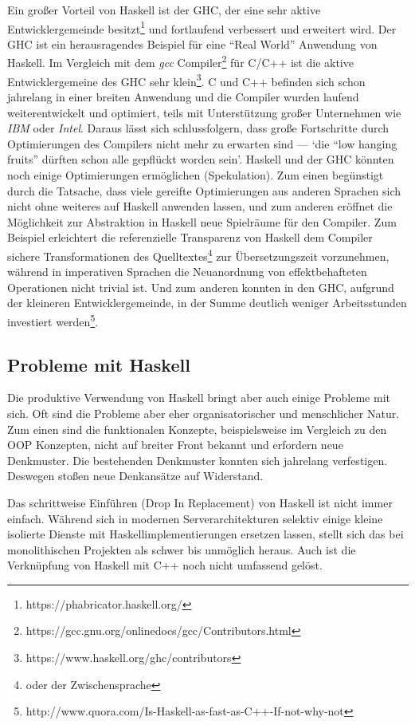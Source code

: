 Ein großer Vorteil von Haskell ist der \ac{GHC}, der eine sehr aktive Entwicklergemeinde besitzt\footnote{https://phabricator.haskell.org/} und fortlaufend verbessert und erweitert wird. Der \ac{GHC} ist ein herausragendes Beispiel für eine "`Real World"' Anwendung von Haskell. Im Vergleich mit dem \textit{gcc} Compiler\footnote{https://gcc.gnu.org/onlinedocs/gcc/Contributors.html} für C/C++ ist die aktive Entwicklergemeine des \ac{GHC} sehr klein\footnote{https://www.haskell.org/ghc/contributors}. C und C++ befinden sich schon jahrelang in einer breiten Anwendung und die Compiler wurden laufend weiterentwickelt und optimiert, teils mit Unterstützung großer Unternehmen wie \textit{IBM} oder \textit{Intel}. Daraus lässt sich schlussfolgern, dass große Fortschritte durch Optimierungen des Compilers nicht mehr zu erwarten sind --- `die "`low hanging fruits"' dürften schon alle gepflückt worden sein'. Haskell und der \ac{GHC} könnten noch einige Optimierungen ermöglichen (Spekulation). Zum einen begünstigt durch die Tatsache, dass viele gereifte Optimierungen aus anderen Sprachen sich nicht ohne weiteres auf Haskell anwenden lassen, und zum anderen eröffnet die Möglichkeit zur Abstraktion in Haskell neue Spielräume für den Compiler. Zum Beispiel erleichtert die referenzielle Transparenz von Haskell dem Compiler sichere Transformationen des Quelltextes\footnote{oder der Zwischensprache} zur Übersetzungszeit vorzunehmen, während in imperativen Sprachen die Neuanordnung von effektbehafteten Operationen nicht trivial ist. Und zum anderen konnten in den \ac{GHC}, aufgrund der kleineren Entwicklergemeinde, in der Summe deutlich weniger Arbeitsstunden investiert werden\footnote{http://www.quora.com/Is-Haskell-as-fast-as-C++-If-not-why-not}.

\subsection{Probleme mit Haskell}\label{sec:probleme-haskell}

Die produktive Verwendung von Haskell bringt aber auch einige Probleme mit sich. Oft sind die Probleme aber eher organisatorischer und menschlicher Natur. Zum einen sind die funktionalen Konzepte, beispielsweise im Vergleich zu den OOP Konzepten, nicht auf breiter Front bekannt und erfordern neue Denkmuster. Die bestehenden Denkmuster konnten sich jahrelang verfestigen. Deswegen stoßen neue Denkansätze auf Widerstand.

Das schrittweise Einführen (Drop In Replacement) von Haskell ist nicht immer einfach. Während sich in modernen Serverarchitekturen selektiv einige kleine isolierte Dienste mit Haskellimplementierungen ersetzen lassen, stellt sich das bei monolithischen Projekten als schwer bis unmöglich heraus. Auch ist die Verknüpfung von Haskell mit C++ noch nicht umfassend gelöst.

